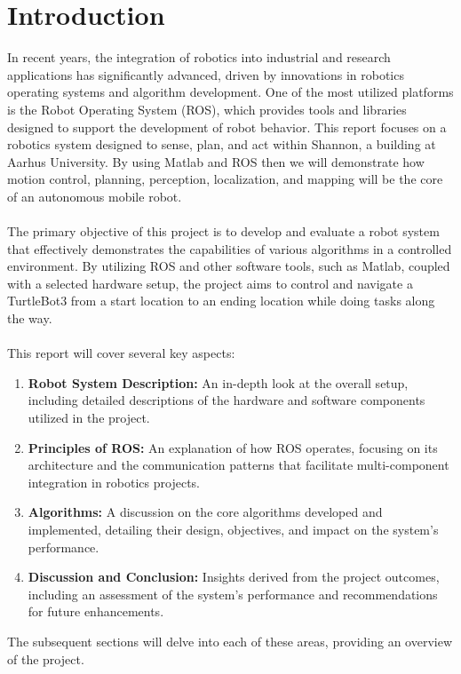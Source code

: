 \documentclass{article}
\begin{document}
	
	\clearpage
	
	\section{Introduction}
	In recent years, the integration of robotics into industrial and research applications has significantly advanced, driven by innovations in robotics operating systems and algorithm development. One of the most utilized platforms is the Robot Operating System (ROS), which provides tools and libraries designed to support the development of robot behavior. This report focuses on a robotics system designed to sense, plan, and act within Shannon, a building at Aarhus University. By using Matlab and ROS then we will demonstrate how motion control, planning, perception, localization, and mapping will be the core of an autonomous mobile robot.
	\\\\
	The primary objective of this project is to develop and evaluate a robot system that effectively demonstrates the capabilities of various algorithms in a controlled environment. By utilizing ROS and other software tools, such as Matlab, coupled with a selected hardware setup, the project aims to control and navigate a TurtleBot3 from a start location to an ending location while doing tasks along the way.
	\\\\
	\noindent This report will cover several key aspects:
	\begin{enumerate}
		\item \textbf{Robot System Description:} An in-depth look at the overall setup, including detailed descriptions of the hardware and software components utilized in the project.
		\item \textbf{Principles of ROS:} An explanation of how ROS operates, focusing on its architecture and the communication patterns that facilitate multi-component integration in robotics projects.
		\item \textbf{Algorithms:} A discussion on the core algorithms developed and implemented, detailing their design, objectives, and impact on the system’s performance.
		\item \textbf{Discussion and Conclusion:} Insights derived from the project outcomes, including an assessment of the system's performance and recommendations for future enhancements.
	\end{enumerate}
	The subsequent sections will delve into each of these areas, providing an overview of the project. 
	
\end{document}
